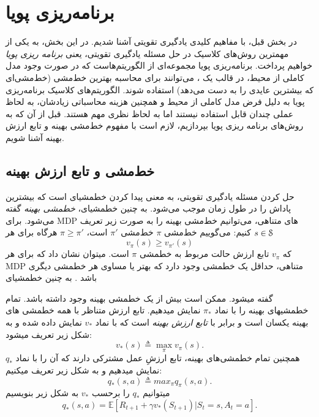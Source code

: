 \section{برنامه‌ریزی پویا}
در بخش قبل، با مفاهیم کلیدی یادگیری تقویتی آشنا شدیم. در این بخش، به یکی از مهم\nf ترین روش‌های کلاسیک در حل مسئله یادگیری تقویتی، یعنی 
\textit{برنامه ریزی پویا}
خواهیم پرداخت. برنامه‌ریزی پویا
 مجموعه‌ای از الگوریتم‌هاست  که در صورت وجود مدل کاملی از محیط، در قالب یک 
،
 می‌توانند برای محاسبه بهترین خط‌مشی (خط‌مشی‌ای که بیش\nf ترین عایدی را به دست می‌دهد) استفاده شوند.
الگوریتم‌های کلاسیک برنامه‌ریزی پویا به دلیل فرض
مدل کاملی از محیط و همچنین هزینه محاسباتی زیادشان، به لحاظ عملی چندان قابل استفاده نیستند اما به لحاظ نظری مهم هستند. قبل از آن که به روش‌های برنامه ریزی پویا بپردازیم، لازم است با مفهوم خط‌مشی بهینه و تابع ارزش بهینه آشنا شویم.
\subsection{خط‌مشی و تابع ارزش بهینه}
حل کردن مسئله یادگیری تقویتی، به معنی پیدا کردن خط\nf مشی\nf ای است که بیشترین پاداش را در طول زمان موجب می‌شود.	به چنین خط\nf مشی\nf ای، 
\textit{خط\nf مشی بهینه} 
گفته می‌شود. برای
 MDP‌ 
 های متناهی، می‌توانیم خط‌مشی بهینه را به صورت زیر تعریف کنیم:
می‌گوییم خط‌مشی $\pi$  خط‌مشی 
$\pi'$
است،
$\pi \ge \pi'$
هرگاه برای هر 
$s \in \EuScript{S}$
$$v_\pi(s) \ge v_{\pi'}(s)$$
که $v_\pi$ تابع ارزش حالت مربوط به خط\nf مشی $\pi$ است.
 می\nf توان نشان داد که برای هر MDP متناهی، حداقل یک خط\nf مشی وجود دارد که بهتر یا مساوی هر خط\nf مشی دیگری باشد
\cite{suttonbook}.
 به چنین خط\nf مشی\nf ای 
 
\textit{}
 گفته می\nf  شود. ممکن است بیش از یک خط\nf مشی بهینه وجود داشته باشد. تمام خط\nf مشی\nf های بهینه را با نماد $\pi_*$  نمایش می\nf دهیم. تابع ارزش متناظر با همه خط\nf مشی\nf
های بهینه یکسان است و برابر با 
\textit{تابع ارزش بهینه}
 است که با نماد $v_*$ نمایش داده شده و به شکل زیر تعریف می\nf شود:
$$v_*(s) \triangleq \max_{\pi} v_\pi(s).$$
همچنین تمام خط\nf مشی\nf ‌های بهینه، تابع ارزشِ عمل مشترکی دارند که آن را با نماد $q_*$ نمایش می\nf دهیم و به شکل زیر تعریف می\nf کنیم:
$$q_*(s,a) \triangleq max_{\pi} q_\pi(s,a).$$
می\nf توانیم $q_*$ را برحسب $v_*$ به شکل زیر بنویسیم
\begin{equation}
q_* (s,a) = \mathbb{E}[R_{t+1} + \gamma v_*(S_{t+1})| S_t=s, A_t=a].
\end{equation}

